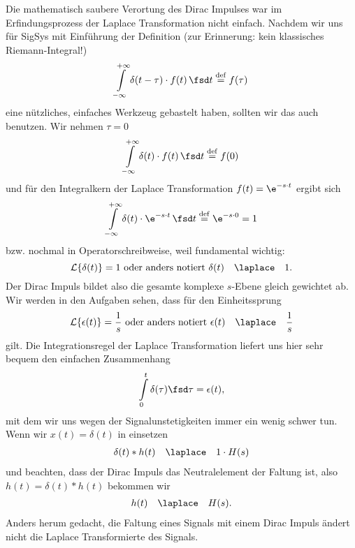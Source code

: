 Die mathematisch saubere Verortung des Dirac Impulses war im Erfindungsprozess
der Laplace Transformation nicht einfach. Nachdem wir uns für SigSys mit Einführung
der Definition (zur Erinnerung: kein klassisches Riemann-Integral!)
\begin{equation}
\int\limits_{-\infty}^{+\infty} \delta(t-\tau) \cdot f(t) \, \fsd t \stackrel{\mathrm{def}}= f(\tau)
\end{equation}
eine nützliches, einfaches Werkzeug gebastelt haben, sollten wir das auch
benutzen.
Wir nehmen $\tau=0$
\begin{equation}
\int\limits_{-\infty}^{+\infty} \delta(t) \cdot f(t) \, \fsd t \stackrel{\mathrm{def}}= f(0)
\end{equation}
und für den Integralkern der Laplace Transformation $f(t)=\e^{-s \cdot t}$
ergibt sich
\begin{equation}
\int\limits_{-\infty}^{+\infty} \delta(t) \cdot \e^{-s \cdot t} \, \fsd t \stackrel{\mathrm{def}}= \e^{-s \cdot 0} = 1
\end{equation}
bzw. nochmal in Operatorschreibweise, weil fundamental wichtig:
%
\begin{equation}
  \mathcal{L}\{\delta(t)\} = 1
  \text{ oder anders notiert }
  \delta(t) \quad\laplace\quad 1.
\end{equation}
%
Der Dirac Impuls bildet also die gesamte komplexe $s$-Ebene gleich gewichtet ab.
%
Wir werden in den Aufgaben sehen, dass für den Einheitssprung
\begin{equation}
  \mathcal{L}\{\epsilon(t)\} = \frac{1}{s}
  \text{ oder anders notiert }
  \epsilon(t) \quad\laplace\quad \frac{1}{s}
\end{equation}
gilt.
Die Integrationsregel der Laplace Transformation liefert uns hier sehr bequem
den einfachen Zusammenhang
\begin{equation}
  \int\limits_{0}^{t} \delta(\tau)\fsd \tau = \epsilon(t),
\end{equation}
mit dem wir uns wegen der Signalunstetigkeiten immer ein wenig schwer tun.
%
Wenn wir $x(t)=\delta(t)$ in  einsetzen
\begin{align}
\delta(t) \ast h(t) \quad\laplace\quad 1 \cdot H(s)
\end{align}
und beachten, dass der Dirac Impuls das Neutralelement der Faltung ist,
also $h(t) = \delta(t) \ast h(t)$ bekommen wir
\begin{align}
h(t) \quad\laplace\quad H(s).
\end{align}
Anders herum gedacht, die Faltung eines Signals mit einem Dirac Impuls
ändert nicht die Laplace Transformierte des Signals.


